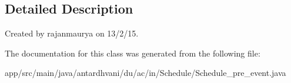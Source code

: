 \subsection{Detailed Description}
Created by rajanmaurya on 13/2/15. 

The documentation for this class was generated from the following file\+:\begin{DoxyCompactItemize}
\item 
app/src/main/java/antardhvani/du/ac/in/\+Schedule/Schedule\+\_\+pre\+\_\+event.\+java\end{DoxyCompactItemize}
